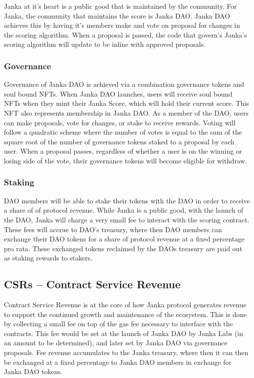 \documentclass{article}
\begin{document}
Janka at it's heart is a public good that is maintained by the community. For Janka, the community that maintains the score is Janka DAO. Janka DAO achieves this by having it's members make and vote on proposal for changes in the scoring algorithm. When a proposal is passed, the code that govern's Janka's scoring algorithm will update to be inline with approved proposals.

\subsubsection{Governance}
Governance of Janka DAO is achieved via a combination governance tokens and soul bound NFTs. When Janka DAO launches, users will receive soul bound NFTs when they mint their Janka Score, which will hold their current score. This NFT also represents membership in Janka DAO. As a member of the DAO, users can make proposals, vote for changes, or stake to receive rewards. Voting will follow a quadratic scheme where the number of votes is equal to the sum of the square root of the number of governance tokens staked to a proposal by each user. When a proposal passes, regardless of whether a user is on the winning or losing side of the vote, their governance tokens will become eligible for withdraw.

\subsubsection{Staking}

DAO members will be able to stake their tokens with the DAO in order to receive a share of of protocol revenue. While Janka is a public good, with the launch of the DAO, Janka will charge a very small fee to interact with the scoring contract. These fees will accrue to DAO's treasury, where then DAO members can exchange their DAO tokens for a share of protocol revenue at a fixed percentage pro rata. These exchanged tokens reclaimed by the DAOs treasury are paid out as staking rewards to stakers. 

\subsection{CSRs -- Contract Service Revenue}
Contract Service Revenue is at the core of how Janka protocol generates revenue to support the continued growth and maintenance of the ecosystem. This is done by collecting a small fee on top of the gas fee necessary to interface with the contracts. This fee would be set at the launch of Janka DAO by Janka Labs (in an amount to be determined), and later set by Janka DAO via governance proposals. Fee revenue accumulates to the Janka treasury, where then it can then be exchanged at a fixed percentage to Janka DAO members in exchange for Janka DAO tokens. 
\end{document}
